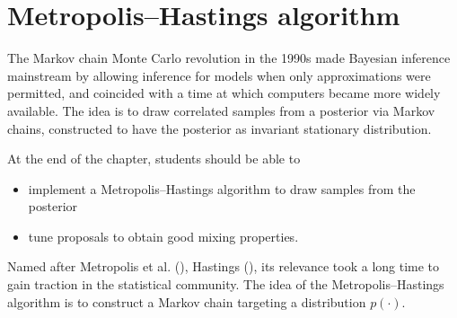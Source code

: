 \documentclass[
  11pt,
  letterpaper,
]{scrbook}
\providecommand{\tightlist}{%
  \setlength{\itemsep}{0pt}\setlength{\parskip}{0pt}}
\theoremstyle{definition}
\theoremstyle{plain}
\theoremstyle{plain}
\theoremstyle{plain}
\theoremstyle{definition}
\theoremstyle{definition}
\theoremstyle{plain}
\theoremstyle{plain}
\theoremstyle{remark}
\begin{document}

\chapter{Metropolis--Hastings
algorithm}\label{metropolishastings-algorithm}

The Markov chain Monte Carlo revolution in the 1990s made Bayesian
inference mainstream by allowing inference for models when only
approximations were permitted, and coincided with a time at which
computers became more widely available. The idea is to draw correlated
samples from a posterior via Markov chains, constructed to have the
posterior as invariant stationary distribution.

\begin{tcolorbox}[enhanced jigsaw, arc=.35mm, bottomrule=.15mm, bottomtitle=1mm, breakable, colback=white, colbacktitle=quarto-callout-important-color!10!white, colframe=quarto-callout-important-color-frame, coltitle=black, left=2mm, leftrule=.75mm, opacityback=0, opacitybacktitle=0.6, rightrule=.15mm, title=\textcolor{quarto-callout-important-color}{\faExclamation}\hspace{0.5em}{\textbf{Learning objectives}:}, titlerule=0mm, toprule=.15mm, toptitle=1mm]

At the end of the chapter, students should be able to

\begin{itemize}
\tightlist
\item
  implement a Metropolis--Hastings algorithm to draw samples from the
  posterior
\item
  tune proposals to obtain good mixing properties.
\end{itemize}

\end{tcolorbox}

Named after Metropolis et al. (),
Hastings (), its relevance took a long
time to gain traction in the statistical community. The idea of the
Metropolis--Hastings algorithm is to construct a Markov chain targeting
a distribution \(p(\cdot).\)
\end{document}
